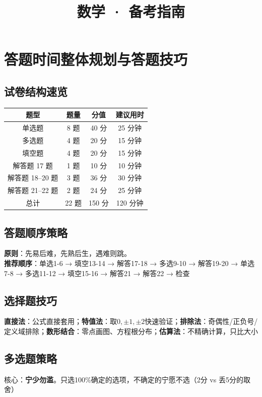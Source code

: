 \documentclass[12pt,a4paper]{ctexbook}
\title{\textbf{数学 · 备考指南}}
\date{}
\begin{document}
\maketitle
\tableofcontents

\chapter{答题时间整体规划与答题技巧}

\section{试卷结构速览}
\begin{center}
\begin{tabular}{c|c|c|c}
题型 & 题量 & 分值 & 建议用时 \\ \hline
单选题 & 8 题 & 40 分 & 25 分钟 \\
多选题 & 4 题 & 20 分 & 15 分钟 \\
填空题 & 4 题 & 20 分 & 15 分钟 \\
解答题 17 题 & 1 题 & 10 分 & 10 分钟 \\
解答题 18--20 题 & 3 题 & 36 分 & 30 分钟 \\
解答题 21--22 题 & 2 题 & 24 分 & 25 分钟 \\ \hline
总计 & 22 题 & 150 分 & 120 分钟
\end{tabular}
\end{center}

\section{答题顺序策略}
\textbf{原则}：先易后难，先熟后生，遇难则跳。\\
\textbf{推荐顺序}：单选1-6 → 填空13-14 → 解答17-18 → 多选9-10 → 解答19-20 → 单选7-8 → 多选11-12 → 填空15-16 → 解答21 → 解答22 → 检查

\section{选择题技巧}
\textbf{直接法}：公式直接套用；\textbf{特值法}：取$0,\pm1,\pm2$快速验证；\textbf{排除法}：奇偶性/正负号/定义域排除；\textbf{数形结合}：零点画图、方程根分布；\textbf{估算法}：不精确计算，只比大小

\section{多选题策略}
核心：\textbf{宁少勿滥}。只选100\%确定的选项，不确定的宁愿不选（2分 vs 丢5分的取舍）
\end{document}

